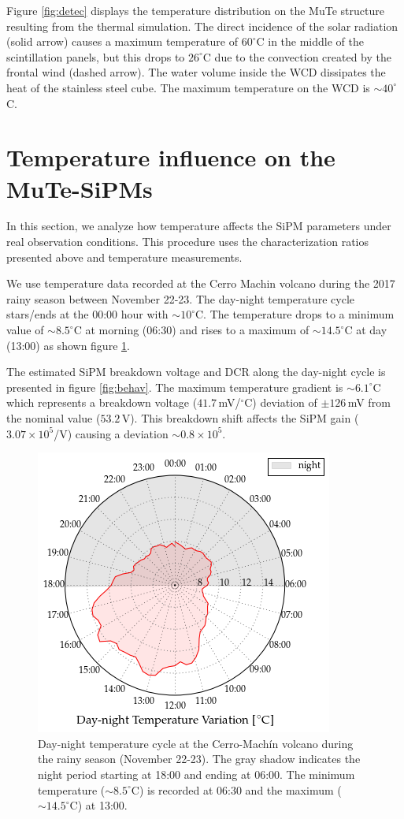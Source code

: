 \documentclass[a4paper,11pt]{article}
\begin{document}
Figure \ref{fig:detec} displays the temperature distribution on the MuTe structure resulting from the thermal simulation. The direct incidence of the solar radiation (solid arrow) causes a maximum temperature of $60^{\circ}$C in the middle of the scintillation panels, but this drops to $26^{\circ}$C due to the convection created by the frontal wind (dashed arrow). The water volume inside the WCD dissipates the heat of the stainless steel cube. The maximum temperature on the WCD is $\sim40^{\circ}$C.

\section{Temperature influence on the MuTe-SiPMs}
\label{sec:temp}

In this section, we analyze how temperature affects the SiPM parameters under real observation conditions. This procedure uses the characterization ratios presented above and temperature measurements.

We use temperature data recorded at the Cerro Machin volcano during the 2017 rainy season between November 22-23. The day-night temperature cycle stars/ends at the 00:00 hour with $\sim10^{\circ}$C. The temperature drops to a minimum value of $\sim8.5^{\circ}$C at morning (06:30) and rises to a maximum of $\sim14.5^{\circ}$C at day (13:00) as shown figure \ref{fig:temp_mach}. 

The estimated SiPM breakdown voltage and DCR along the day-night cycle is presented in figure \ref{fig:behav}. The maximum temperature gradient is $\sim6.1^{\circ}$C which represents a breakdown voltage ($41.7$\,mV/$^{\circ}$C) deviation of $\pm126$\,mV from the nominal value ($53.2$\,V). This breakdown shift affects the SiPM gain ($3.07\times10^5$/V) causing a deviation $\sim0.8\times 10^5$.


\begin{figure}[htbp]
\centering 
\includegraphics[width=.4\textwidth]{Figures/Temp.png}
\caption{\label{fig:temp_mach} Day-night temperature cycle at the Cerro-Mach\'in volcano during the rainy season (November 22-23). The gray shadow indicates the night period starting at 18:00 and ending at 06:00. The minimum temperature ($\sim8.5^{\circ}$C) is recorded at 06:30 and the maximum ($\sim14.5^{\circ}$C) at 13:00. }
\end{figure}
\end{document}
